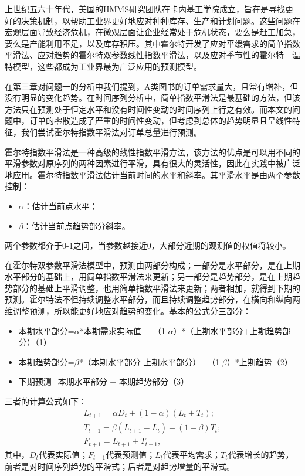 \documentclass[bwprint]{gmcmthesis}
\begin{document}
上世纪五六十年代，美国的HMMS研究团队在卡内基工学院成立，旨在是寻找更好的决策机制，以帮助工业界更好地应对种种库存、生产和计划问题。这些问题在宏观层面导致经济危机，在微观层面让企业经常处于危机状态，要么是赶工加急，要么是产能利用不足，以及库存积压。其中霍尔特开发了应对平缓需求的简单指数平滑法、应对趋势的霍尔特双参数线性指数平滑法，以及应对季节性的霍尔特—温特模型，这些都成为工业界最为广泛应用的预测模型。

在第三章对问题一的分析中我们提到，A类图书的订单需求量大，且常有增补，但没有明显的变化趋势。在时间序列分析中，简单指数平滑法是最基础的方法，但该方法只在预测处于恒定水平和没有时间性变动的时间序列上行之有效。而本文的问题中，订单的零散造成了严重的时间性变动，但考虑到总体的趋势明显且呈线性特征，我们尝试霍尔特指数平滑法对订单总量进行预测。

霍尔特指数平滑法是一种高级的线性指数平滑方法，该方法的优点是可以用不同的平滑参数对原序列的两种因素进行平滑，具有很大的灵活性，因此在实践中被广泛地应用。霍尔特指数平滑法估计当前时间的水平和斜率。其平滑水平是由两个参数控制：
\begin{itemize}
  \item $\alpha$：估计当前点水平；
  \item $\beta$：估计当前点趋势部分斜率。
\end{itemize}
两个参数都介于0-1之间，当参数越接近0，大部分近期的观测值的权值将较小。

在霍尔特双参数平滑法模型中，预测由两部分构成；一部分是水平部分，是在上期水平部分的基础上，用简单指数平滑法来更新；另一部分是趋势部分，是在上期趋势部分的基础上平滑调整，也用简单指数平滑法来更新；两者相加，就得到下期的预测。霍尔特法不但持续调整水平部分，而且持续调整趋势部分，在横向和纵向两维调整预测，所以能更好地应对趋势的变化。基本的公式分三部分：
\begin{itemize}
  \item 本期水平部分=$\alpha$*本期需求实际值 + （1-$\alpha$）*（上期水平部分+上期趋势部分）（1）
  \item 本期趋势部分=$\beta$*（本期水平部分-上期水平部分）+（1-$\beta$）*上期趋势（2）
  \item 下期预测=本期水平部分 + 本期趋势部分（3）
\end{itemize}

三者的计算公式如下：
\begin{equation}
\label{eq:holt}
\begin{aligned}
L_{t+1} = \alpha D_t +(1-\alpha)(L_t+T_t);\\
T_{t+1} = \beta (L_{t+1}-L_t) +(1-\beta)T_t;\\
F_{t+1} = L_{t+1} + T_{t+1},
\end{aligned}
\end{equation}
其中，$D_t$代表实际值；$F_{t+1}$代表预测值；$L_t$代表平均需求；$T_t$代表增长的趋势，前者是对时间序列趋势的平滑式；后者是对趋势增量的平滑式。
\end{document}
